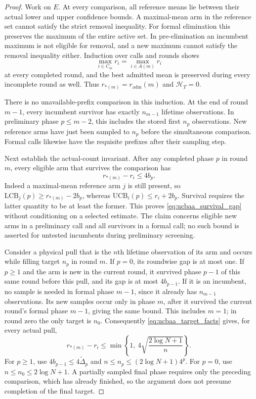 \begin{proof}
Work on $E$. At every comparison, all reference means lie between their
actual lower and upper confidence bounds. A maximal-mean arm in the
reference set cannot satisfy the strict removal inequality. For formal
elimination this preserves the maximum of the entire active set. In
pre-elimination an incumbent maximum is not eligible for removal, and a
new maximum cannot satisfy the removal inequality either. Induction over
calls and rounds shows
\[
 \max_{i\in C_m}r_i=\max_{i\in A(m)}r_i
\]
at every completed round, and the best admitted mean is preserved during
every incomplete round as well. Thus
$r_{*(m)}=r_{\mathrm{adm}}(m)$ and $\mathcal H_T=0$.

There is no unavailable-prefix comparison in this induction. At the end
of round $m-1$, every incumbent survivor has exactly $n_{m-1}$ lifetime
observations. In preliminary phase $p\le m-2$, this includes the stored
first $n_p$ observations. New reference arms have just been sampled to
$n_p$ before the simultaneous comparison. Formal calls likewise have
the requisite prefixes after their sampling step.

Next establish the actual-count invariant. After any completed phase $p$
in round $m$, every eligible arm that survives the comparison has
\begin{equation}
 r_{*(m)}-r_i\le4b_p.
 \label{eq:ucbaa_survival_gap}
\end{equation}
Indeed a maximal-mean reference arm $j$ is still present, so
$\mathrm{LCB}_j(p)\ge r_{*(m)}-2b_p$, whereas
$\mathrm{UCB}_i(p)\le r_i+2b_p$. Survival requires the latter quantity
to be at least the former. This proves
\eqref{eq:ucbaa_survival_gap} without conditioning on a selected estimate.
The claim concerns eligible new arms in a preliminary call and all
survivors in a formal call; no such bound is asserted for untested
incumbents during preliminary screening.

Consider a physical pull that is the $n$th lifetime observation of its arm
and occurs while filling target $n_p$ in round $m$. If $p=0$, its roundwise
gap is at most one. If $p\ge1$ and the arm is new in the current round,
it survived phase $p-1$ of this same round before this pull, and its gap
is at most $4b_{p-1}$. If it is an incumbent, no sample is needed in
formal phase $m-1$, since it already has $n_{m-1}$ observations.
Its new samples occur only in phase $m$, after it survived the current
round's formal phase $m-1$, giving the same bound. This includes $m=1$;
in round zero the only target is $n_0$.
Consequently \eqref{eq:ucbaa_target_facts} gives, for every actual pull,
\begin{equation}
 r_{*(m)}-r_i\le
 \min\left\{1,\ 4\sqrt{\frac{2\log N+1}{n}}\right\}.
 \label{eq:ucbaa_actual_prefix_charge}
\end{equation}
For $p\ge1$, use $4b_{p-1}\le4\widetilde\Delta_p$ and
$n\le n_p\le(2\log N+1)4^p$. For $p=0$, use
$n\le n_0\le2\log N+1$. A partially sampled final phase requires
only the preceding comparison, which has already finished, so the
argument does not presume completion of the final target.


\end{proof}
